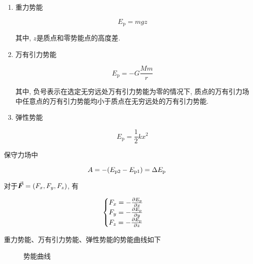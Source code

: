 \begin{enumerate}
	
	\item 重力势能
	
	\begin{equation}
		E_{\mathrm{p}} = mgz \label{C3-eq16}
	\end{equation}
	
	其中, $z$是质点和零势能点的高度差. 
	
	\item 万有引力势能
	
	\begin{equation}
		E_{\mathrm{p}} = - G \dfrac{Mm}{r} \label{C3-eq17}
	\end{equation}
	
	其中, 负号表示在选定无穷远处万有引力势能为零的情况下, 质点的万有引力场中任意点的万有引力势能均小于质点在无穷远处的万有引力势能. 
	
	\item 弹性势能
	
	\begin{equation}
		E_{\mathrm{p}} = \dfrac{1}{2} k x^2 \label{C3-eq18}
	\end{equation}
	
\end{enumerate}

保守力场中

\begin{equation}
	A = - \qty(E_{\mathrm{p2}} - E_{\mathrm{p}1}) = \Delta E_{\mathrm{p}} \label{C3-eq19}
\end{equation}

对于$\va*{F} = \qty(F_x, F_y, F_z)$, 有

\begin{equation}
	\begin{cases}
		F_x = - \pdv{E_{\mathrm{p}}}{x} \\
		F_y = - \pdv{E_{\mathrm{p}}}{y} \\
		F_z = - \pdv{E_{\mathrm{p}}}{z}
	\end{cases}
    \label{C3-eq20}
\end{equation}

重力势能、万有引力势能、弹性势能的势能曲线如下

\begin{figure}[H]
	\centering
	\hspace{0.3in} %
	\hspace{0.3in} %
	\caption{势能曲线}
\end{figure}

